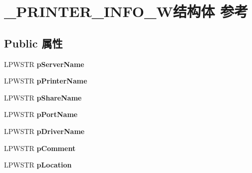 \hypertarget{struct___p_r_i_n_t_e_r___i_n_f_o__2_w}{}\section{\+\_\+\+P\+R\+I\+N\+T\+E\+R\+\_\+\+I\+N\+F\+O\+\_\+W结构体 参考}
\label{struct___p_r_i_n_t_e_r___i_n_f_o__2_w}
\subsection*{Public 属性}
\begin{DoxyCompactItemize}
\item 
\mbox{\label{struct___p_r_i_n_t_e_r___i_n_f_o__2_w_a4dedd943b533867c31a566f2a78142e1}} 
L\+P\+W\+S\+TR {\bfseries p\+Server\+Name}
\item 
\mbox{\label{struct___p_r_i_n_t_e_r___i_n_f_o__2_w_a7a62094bfd8c51331beef7a83695ac53}} 
L\+P\+W\+S\+TR {\bfseries p\+Printer\+Name}
\item 
\mbox{\label{struct___p_r_i_n_t_e_r___i_n_f_o__2_w_acc96d8ce154a79cfc95e05102493ac1e}} 
L\+P\+W\+S\+TR {\bfseries p\+Share\+Name}
\item 
\mbox{\label{struct___p_r_i_n_t_e_r___i_n_f_o__2_w_aa67533833b39ea5de379b5229d0504ff}} 
L\+P\+W\+S\+TR {\bfseries p\+Port\+Name}
\item 
\mbox{\label{struct___p_r_i_n_t_e_r___i_n_f_o__2_w_acaa863f1e3ea04fbed020ab0b26e2977}} 
L\+P\+W\+S\+TR {\bfseries p\+Driver\+Name}
\item 
\mbox{\label{struct___p_r_i_n_t_e_r___i_n_f_o__2_w_a85d77c316282a777b58d9422a0092708}} 
L\+P\+W\+S\+TR {\bfseries p\+Comment}
\item 
\mbox{\label{struct___p_r_i_n_t_e_r___i_n_f_o__2_w_a76f9891a931c033f4d622850c0fc7975}} 
L\+P\+W\+S\+TR {\bfseries p\+Location}
\item 
\mbox{\label{struct___p_r_i_n_t_e_r___i_n_f_o__2_w_ad1e90a5e0166f49c0c00b124832238f7}} 

\end{DoxyCompactItemize}
